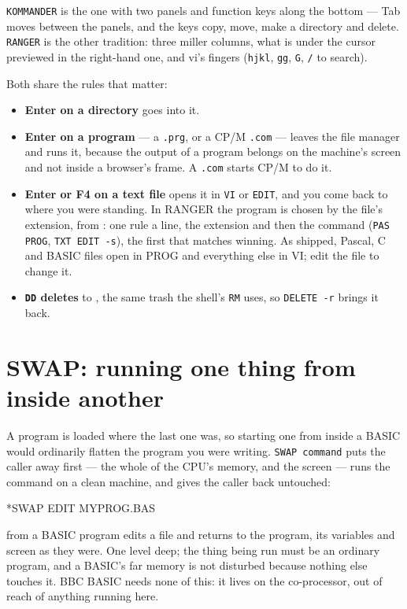 \verb|KOMMANDER| is the one with two panels and function keys along the
bottom --- Tab moves between the panels, and the keys copy, move, make a
directory and delete. \verb|RANGER| is the other tradition: three miller
columns, what is under the cursor previewed in the right-hand one, and
vi's fingers (\verb|hjkl|, \verb|gg|, \verb|G|, \verb|/| to search).

Both share the rules that matter:

\begin{itemize}[leftmargin=1.4em]
\item \textbf{Enter on a directory} goes into it.
\item \textbf{Enter on a program} --- a \texttt{.prg}, or a CP/M
  \texttt{.com} --- leaves the file manager and runs it, because the
  output of a program belongs on the machine's screen and not inside a
  browser's frame. A \texttt{.com} starts CP/M to do it.
\item \textbf{Enter or F4 on a text file} opens it in \verb|VI| or
  \verb|EDIT|, and you come back to where you were standing. In RANGER
  the program is chosen by the file's extension, from
  : one rule a line, the extension and then
  the command (\texttt{PAS PROG}, \texttt{TXT EDIT -s}), the first that
  matches winning. As shipped, Pascal, C and BASIC files open in PROG and
  everything else in VI; edit the file to change it.
\item \textbf{\texttt{DD} deletes} to , the same trash the
  shell's \verb|RM| uses, so \verb|DELETE -r| brings it back.
\end{itemize}

\section{SWAP: running one thing from inside another}
A program is loaded where the last one was, so starting one from inside a
BASIC would ordinarily flatten the program you were writing.
\verb|SWAP command| puts the caller away first --- the whole of the CPU's
memory, and the screen --- runs the command on a clean machine, and gives
the caller back untouched:

\begin{type}
*SWAP EDIT MYPROG.BAS
\end{type}

from a BASIC program edits a file and returns to the program, its
variables and screen as they were. One level deep; the thing being run must be an ordinary
program, and a BASIC's far memory is not disturbed because nothing else
touches it. BBC BASIC needs none of this: it lives on the co-processor,
out of reach of anything running here.

